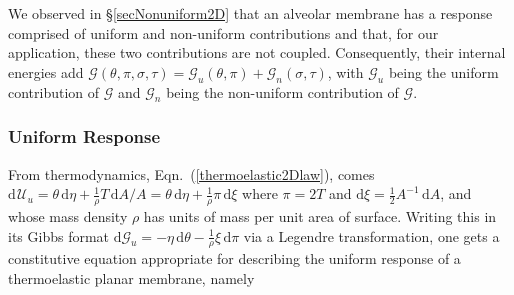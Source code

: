 We observed in \S\ref{secNonuniform2D} that an alveolar membrane has a response comprised of uniform and non-uniform contributions and that, for our application, these two contributions are not coupled.  Consequently, their internal energies add $\mathcal{G} (\theta , \pi , \sigma , \tau ) = \mathcal{G}_u (\theta , \pi ) + \mathcal{G}_n (\sigma , \tau)$, with $\mathcal{G}_u$ being the uniform contribution of $\mathcal{G}$ and $\mathcal{G}_n$ being the non-uniform contribution of $\mathcal{G}$.

\subsubsection{Uniform Response}

From thermo\-dynamics, Eqn.~(\ref{thermoelastic2Dlaw}), comes $\mathrm{d}\hspace{1pt}\mathcal{U}_u = \theta \, \mathrm{d} \eta + \tfrac{1}{\rho} T \, \mathrm{d}A / \! A = \theta \, \mathrm{d} \eta + \tfrac{1}{\rho} \pi \, \mathrm{d}\xi$ where $\pi = 2T$ and $\mathrm{d}\xi = \tfrac{1}{2} A^{-1} \, \mathrm{d}A$, and whose mass density $\rho$ has units of mass per unit area of surface.  Writing this in its Gibbs format $\mathrm{d} \mathcal{G}_u = -\eta \, \mathrm{d} \theta - \tfrac{1}{\rho} \xi \, \mathrm{d} \pi$ via a Legendre transformation, one gets a constitutive equation appropriate for describing the uniform response of a thermo\-elastic planar membrane, namely
